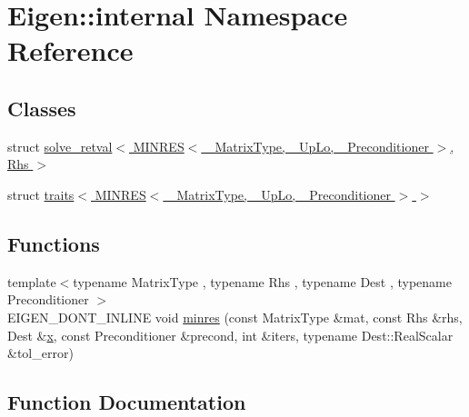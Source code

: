 \hypertarget{namespace_eigen_1_1internal}{}\section{Eigen\+:\+:internal Namespace Reference}
\label{namespace_eigen_1_1internal}
\subsection*{Classes}
\begin{DoxyCompactItemize}
\item 
struct \hyperlink{struct_eigen_1_1internal_1_1solve__retval_3_01_m_i_n_r_e_s_3_01___matrix_type_00_01___up_lo_00_033d2aeef68dae51d28c316c0d126c387}{solve\+\_\+retval$<$ M\+I\+N\+R\+E\+S$<$ \+\_\+\+Matrix\+Type, \+\_\+\+Up\+Lo, \+\_\+\+Preconditioner $>$, Rhs $>$}
\item 
struct \hyperlink{struct_eigen_1_1internal_1_1traits_3_01_m_i_n_r_e_s_3_01___matrix_type_00_01___up_lo_00_01___preconditioner_01_4_01_4}{traits$<$ M\+I\+N\+R\+E\+S$<$ \+\_\+\+Matrix\+Type, \+\_\+\+Up\+Lo, \+\_\+\+Preconditioner $>$ $>$}
\end{DoxyCompactItemize}
\subsection*{Functions}
\begin{DoxyCompactItemize}
\item 
{\footnotesize template$<$typename Matrix\+Type , typename Rhs , typename Dest , typename Preconditioner $>$ }\\E\+I\+G\+E\+N\+\_\+\+D\+O\+N\+T\+\_\+\+I\+N\+L\+I\+N\+E void \hyperlink{namespace_eigen_1_1internal_a74d426d424d3efaf67afec989c13bceb}{minres} (const Matrix\+Type \&mat, const Rhs \&rhs, Dest \&\hyperlink{generate_s_t_lcyl_8m_a9336ebf25087d91c818ee6e9ec29f8c1}{x}, const Preconditioner \&precond, int \&iters, typename Dest\+::\+Real\+Scalar \&tol\+\_\+error)
\end{DoxyCompactItemize}


\subsection{Function Documentation}
\hypertarget{namespace_eigen_1_1internal_a74d426d424d3efaf67afec989c13bceb}{}
